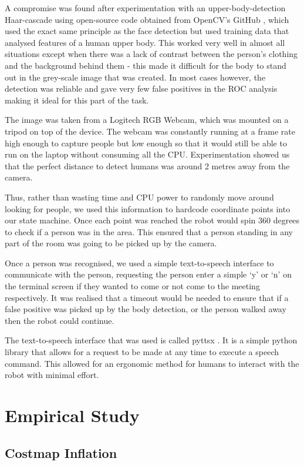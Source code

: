 A compromise was found after experimentation with an upper-body-detection Haar-cascade using open-source code obtained from OpenCV’s GitHub \parencite{git}, which used the exact same principle as the face detection but used training data that analysed features of a human upper body. This worked very well in almost all situations except when there was a lack of contrast between the person’s clothing and the background behind them - this made it difficult for the body to stand out in the grey-scale image that was created. In most cases however, the detection was reliable and gave very few false positives in the ROC analysis making it ideal for this part of the task.

The image was taken from a Logitech RGB Webcam, which was mounted on a tripod on top of the device. The webcam was constantly running at a frame rate high enough to capture people but low enough so that it would still be able to run on the laptop without consuming all the CPU. Experimentation showed us that the perfect distance to detect humans was around 2 metres away from the camera. 

Thus, rather than wasting time and CPU power to randomly move around looking for people, we used this information to hardcode coordinate points into our state machine. Once each point was reached the robot would spin 360 degrees to check if a person was in the area. This ensured that a person standing in any part of the room was going to be picked up by the camera. 

Once a person was recognised, we used a simple text-to-speech interface to communicate with the person, requesting the person enter a simple ‘y’ or ‘n’ on the terminal screen if they wanted to come or not come to the meeting respectively. It was realised that a timeout would be needed to ensure that if a false positive was picked up by the body detection, or the person walked away then the robot could continue. 

The text-to-speech interface that was used is called pyttsx \parencite{pp}. It is a simple python library that allows for a request to be made at any time to execute a speech command. This allowed for an ergonomic method for humans to interact with the robot with minimal effort. 

\section{Empirical Study}

\subsection{Costmap Inflation}

